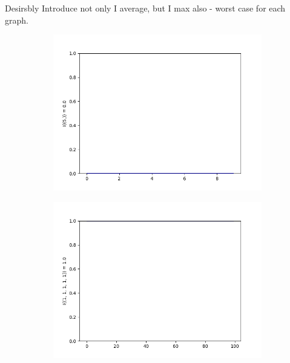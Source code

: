 \documentclass{llncs}
\begin{document}
{\color{red} Desirsbly Introduce not only I average, but I max also - worst case for each graph.}
\begin{figure}
\begin{subfigure}{0.5\linewidth}
\centering\includegraphics[scale=0.4]{images/1-consistent-partition.png}\hfill
\end{subfigure}
\begin{subfigure}{0.5\linewidth}
\centering\includegraphics[scale=0.4]{images/1-1-1-1-1-consistent-partitions-probability.png}
\end{subfigure}
\end{figure}
\end{document}
